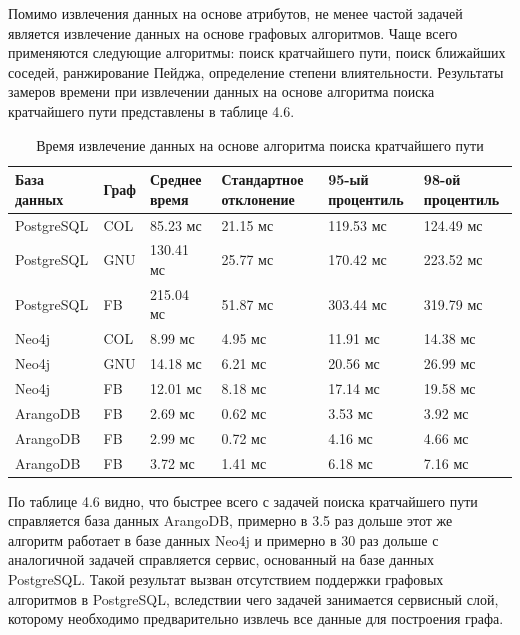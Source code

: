 Помимо извлечения данных на основе атрибутов, не менее частой задачей является извлечение данных на основе графовых алгоритмов. Чаще всего
применяются следующие алгоритмы: поиск кратчайшего пути, поиск ближайших соседей, ранжирование Пейджа, определение степени влиятельности.
Результаты замеров времени при извлечении данных на основе алгоритма поиска кратчайшего пути представлены в таблице 4.6.

\begin{table} [htbp]
    \centering\small
    \caption{Время извлечение данных на основе алгоритма поиска кратчайшего пути}
    \begin{tabular}{|p{3cm}|p{1cm}|p{2cm}|p{2cm}|p{2cm}|p{2cm}|}
        \hline
        База данных & Граф & Среднее время & Стандартное отклонение & 95-ый процентиль & 98-ой процентиль \\ \hline
        PostgreSQL  & COL  & 85.23 мс      & 21.15 мс               & 119.53 мс        & 124.49 мс        \\ \hline
        PostgreSQL  & GNU  & 130.41 мс     & 25.77 мс               & 170.42 мс        & 223.52 мс        \\ \hline
        PostgreSQL  & FB   & 215.04 мс     & 51.87 мс               & 303.44 мс        & 319.79 мс        \\ \hline
        Neo4j       & COL  & 8.99 мс       & 4.95 мс                & 11.91 мс         & 14.38 мс         \\ \hline
        Neo4j       & GNU  & 14.18 мс      & 6.21 мс                & 20.56 мс         & 26.99 мс         \\ \hline
        Neo4j       & FB   & 12.01 мс      & 8.18 мс                & 17.14 мс         & 19.58 мс         \\ \hline
        ArangoDB    & FB   & 2.69 мс       & 0.62 мс                & 3.53 мс          & 3.92 мс          \\ \hline
        ArangoDB    & FB   & 2.99 мс       & 0.72 мс                & 4.16 мс          & 4.66 мс          \\ \hline
        ArangoDB    & FB   & 3.72 мс       & 1.41 мс                & 6.18 мс          & 7.16 мс          \\ \hline
    \end{tabular}
    \normalsize
\end{table}

По таблице 4.6 видно, что быстрее всего с задачей поиска кратчайшего пути справляется база данных ArangoDB, примерно в 3.5 раз дольше этот
же алгоритм работает в базе данных Neo4j и примерно в 30 раз дольше с аналогичной задачей справляется сервис, основанный на базе данных
PostgreSQL. Такой результат вызван отсутствием поддержки графовых алгоритмов в PostgreSQL, вследствии чего задачей занимается сервисный
слой, которому необходимо предварительно извлечь все данные для построения графа.

